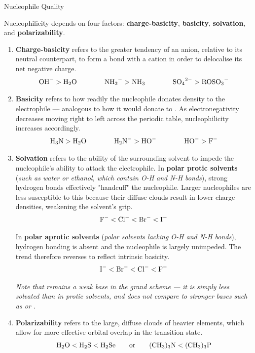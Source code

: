 \documentclass[10pt]{article}
\begin{document}
  \begin{core}{Nucleophile Quality}

    Nucleophilicity depends on four factors: \textbf{charge-basicity}, \textbf{basicity}, \textbf{solvation}, and \textbf{polarizability}.

    \begin{enumerate}

      \item \textbf{Charge-basicity} refers to the greater tendency of an anion, relative to its neutral counterpart, to form a bond with a cation in order to delocalise its net negative charge.
      \[
        \ce{OH-} > \ce{H2O}\qquad\qquad\ce{NH2-} > \ce{NH3}\qquad\qquad\ce{SO4^{2-}} > \ce{ROSO3-}
      \]

      \item \textbf{Basicity} refers to how readily the nucleophile donates  density to the electrophile --- analogous to how it would donate to . As electronegativity decreases moving right to left across the periodic table, nucleophilicity increases accordingly.
      \[
        \ce{H3N} > \ce{H2O}\qquad\qquad\ce{H2N-} > \ce{HO-}\qquad\qquad\ce{HO-} > \ce{F-}
      \]

      \item \textbf{Solvation} refers to the ability of the surrounding solvent to impede the nucleophile's ability to attack the electrophile. In \textbf{polar protic solvents} (\textit{such as water or ethanol, which contain O-H and N-H bonds}), strong hydrogen bonds effectively "handcuff" the nucleophile. Larger nucleophiles are less susceptible to this because their diffuse  clouds result in lower charge densities, weakening the solvent's grip.
      \[
        \ce{F-} < \ce{Cl-} < \ce{Br-} < \ce{I-}
      \]

      In \textbf{polar aprotic solvents} (\textit{polar solvents lacking O-H and N-H bonds}), hydrogen bonding is absent and the nucleophile is largely unimpeded. The trend therefore reverses to reflect intrinsic basicity.
      \[
        \ce{I-} < \ce{Br-} < \ce{Cl-} < \ce{F-}
      \]

      \textit{Note that  remains a weak base in the grand scheme --- it is simply less solvated than  in protic solvents, and does not compare to stronger bases such as  or .}

      \item \textbf{Polarizability} refers to the large, diffuse  clouds of heavier elements, which allow for more effective orbital overlap in the \snt transition state.
      \[
        \ce{H2O} < \ce{H2S} < \ce{H2Se} \qquad\text{or}\qquad \ce{(CH3)3N} < \ce{(CH3)3P}
      \]
    

\end{enumerate}
\end{core}
\end{document}
